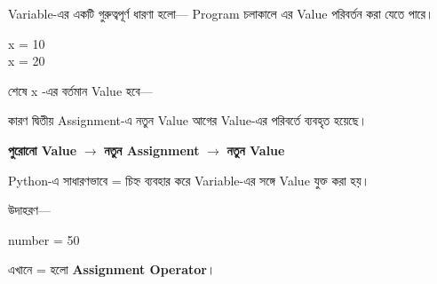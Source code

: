 

Variable-এর একটি গুরুত্বপূর্ণ ধারণা হলো—
Program চলাকালে এর Value পরিবর্তন করা যেতে পারে।

\begin{codebox}

\begin{english}
\ttfamily
x = 10\\
x = 20
\end{english}

\end{codebox}

শেষে
\textenglish{\ttfamily x}
-এর বর্তমান Value হবে—

\begin{codebox}

\begin{english}
\end{english}

\end{codebox}

কারণ দ্বিতীয় Assignment-এ নতুন Value
আগের Value-এর পরিবর্তে ব্যবহৃত হয়েছে।

\begin{center}

\textbf{পুরোনো Value}
\(\longrightarrow\)
\textbf{নতুন Assignment}
\(\longrightarrow\)
\textbf{নতুন Value}

\end{center}



Python-এ সাধারণভাবে
\textenglish{\ttfamily =}
চিহ্ন ব্যবহার করে Variable-এর সঙ্গে Value যুক্ত করা হয়।

উদাহরণ—

\begin{codebox}

\begin{english}
\ttfamily
number = 50
\end{english}

\end{codebox}

এখানে
\textenglish{\ttfamily =}
হলো \textbf{Assignment Operator}।

